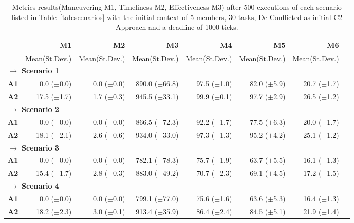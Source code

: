 \begin{table}[h]
	\small
	\fontsize{7}{7}\selectfont
	\centering
	\caption{Metrics results(Maneuvering-M1, Timeliness-M2, Effectiveness-M3)  after 500 executions of each scenario listed in Table~\ref{tab:scenarios} with the initial context of 5 members, 30 tasks, De-Conflicted as initial C2 Approach and a deadline of 1000 ticks.}
	\label{table:results01}
	
	\begin{tabular}{rrrrrrrr} \hline 
	    & \bf{M1}
		& \bf{M2}
        & \bf{M3}
        & \bf{M4}
		& \bf{M5}
		& \bf{M6} \\  \hline 
		
		& Mean(St.Dev.)  & Mean(St.Dev.) & Mean(St.Dev.)  & Mean(St.Dev.) & Mean(St.Dev.) & Mean(St.Dev.)  \\ [1ex]
		
		\multicolumn{7}{l}{\textbf{$\longrightarrow$ Scenario 1 }} \\
\bf{A1}  & 0.0 ($\pm$0.0)  & 0.0 ($\pm$0.0)  & 890.0 ($\pm$66.8)  & 97.5 ($\pm$1.0)  & 82.0 ($\pm$5.9)  & 20.7 ($\pm$1.7)  \\
\bf{A2}  & 17.5 ($\pm$1.7)  & 1.7 ($\pm$0.3)  & 945.5 ($\pm$33.1)  & 99.9 ($\pm$0.1)  & 97.7 ($\pm$2.9)  & 26.5 ($\pm$1.2)  \\ [1ex]
	
	\multicolumn{6}{l}{\textbf{$\longrightarrow$ Scenario 2 }} \\
\bf{A1}  & 0.0 ($\pm$0.0)  & 0.0 ($\pm$0.0)  & 866.5 ($\pm$72.3)  & 92.2 ($\pm$1.7)  & 77.5 ($\pm$6.3)  & 20.0 ($\pm$1.7)  \\
\bf{A2}  & 18.1 ($\pm$2.1)  & 2.6 ($\pm$0.6)  & 934.0 ($\pm$33.0)  & 97.3 ($\pm$1.3)  & 95.2 ($\pm$4.2)  & 25.1 ($\pm$1.2)  \\ [1ex]
	
	\multicolumn{6}{l}{\textbf{$\longrightarrow$ Scenario 3 }} \\
\bf{A1}  & 0.0 ($\pm$0.0)  & 0.0 ($\pm$0.0)  & 782.1 ($\pm$78.3)  & 75.7 ($\pm$1.9)  & 63.7 ($\pm$5.5)  & 16.1 ($\pm$1.3)  \\
\bf{A2}  & 15.4 ($\pm$1.7)  & 2.8 ($\pm$0.3)  & 883.0 ($\pm$49.2)  & 70.7 ($\pm$2.3)  & 69.1 ($\pm$4.5)  & 17.2 ($\pm$1.5)  \\ [1ex]
	
	\multicolumn{6}{l}{\textbf{$\longrightarrow$ Scenario 4 }} \\
\bf{A1}  & 0.0 ($\pm$0.0)  & 0.0 ($\pm$0.0)  & 799.1 ($\pm$77.0)  & 75.6 ($\pm$1.6)  & 63.6 ($\pm$5.3)  & 16.4 ($\pm$1.3)  \\
\bf{A2}  & 18.2 ($\pm$2.3)  & 3.0 ($\pm$0.1)  & 913.4 ($\pm$35.9)  & 86.4 ($\pm$2.4)  & 84.5 ($\pm$5.1)  & 21.9 ($\pm$1.4)  \\ [1ex]
	

\end{tabular}
\end{table}
